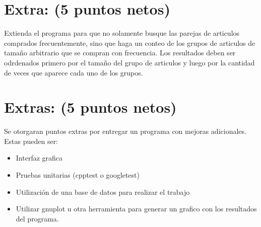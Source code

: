 \documentclass{article}
\begin{document}
\section*{Extra: (5 puntos netos)}

Extienda el programa para que no solamente busque las parejas de articulos comprados frecuentemente,
sino que haga un conteo de los grupos de articulos de tama\~no arbitrario que se compran con
frecuencia. Los resultados deben ser odrdenados primero por el tama\~no del grupo de articulos y
luego por la cantidad de veces que aparece cada uno de los grupos.

\section*{Extras: (5 puntos netos)}

Se otorgaran puntos extras por entregar un programa con mejoras adicionales. Estas pueden
ser:
\begin{itemize}
        \item{Interfaz grafica}
        \item{Pruebas unitarias (cpptest o googletest)}
        \item{Utilizaci\'on de una base de datos para realizar el trabajo}
        \item{Utilizar gnuplot u otra herramienta para generar un grafico con los resultados del programa.}
\end{itemize}
\end{document}
